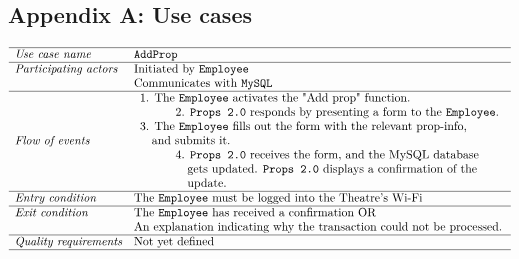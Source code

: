 \documentclass[12pt]{article}
\begin{document}
\subsection{Appendix A: Use cases}
\[
\begin{array}{ll}
\hline
\textit{Use case name} & \texttt{AddProp} \\
\hline
\textit{Participating actors} & \text{Initiated by \texttt{Employee}} \\
& \text{Communicates with \texttt{MySQL}} \\
\hline
\textit{Flow of events} & 
\begin{array}{l}
\text{1. The \texttt{Employee} activates the "Add prop"  function.}\\
\quad \quad \quad \text{2. \texttt{Props 2.0} responds by presenting a form to the \texttt{Employee}.} \\
\text{3. The \texttt{Employee} fills out the form with the relevant prop-info,} \\ \quad \text{and submits it.} \\
\quad \quad \quad \text{4. \texttt{Props 2.0} receives the form, and the MySQL database} \\ \quad \quad \quad \quad \text{gets updated. \texttt{Props 2.0} displays a confirmation of the}\\ \quad \quad \quad \quad \text{update.}
\end{array} \\
\hline
\textit{Entry condition} & \text{The \texttt{Employee} must be logged into the Theatre's Wi-Fi} \\
\hline
\textit{Exit condition} & \text{The \texttt{Employee} has received a confirmation OR} \\ & \text{An explanation indicating why the transaction could not be processed.} \\
\hline
\textit{Quality requirements} & \text{Not yet defined} \\
\hline
\end{array}
\]
\\
\\
\end{document}
